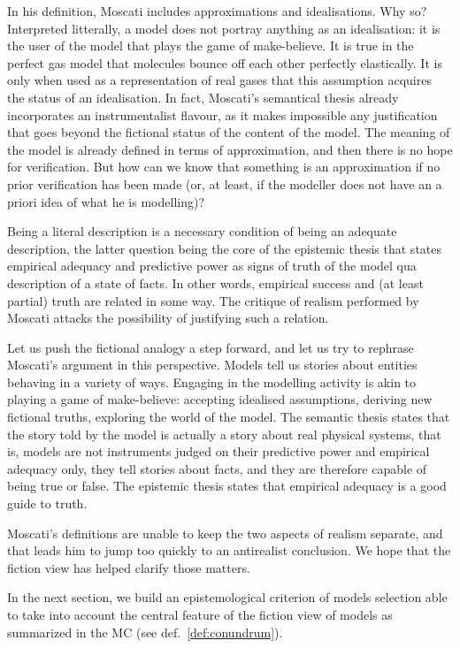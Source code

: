 \documentclass[a4paper,11pt]{article}
\theoremstyle{definition}
\begin{document}
In his definition, Moscati includes approximations and idealisations. Why so? Interpreted litterally, a model does not portray anything as an idealisation: it is the user of the model that plays the game of make-believe. It is true in the perfect gas model that molecules bounce off each other perfectly elastically. It is only when used as a representation of real gases that this assumption acquires the status of an idealisation. In fact, Moscati's semantical thesis already incorporates an instrumentalist flavour, as it makes impossible any justification that goes beyond the fictional status of the content of the model. The meaning of the model is already defined in terms of approximation, and then there is no hope for verification. But how can we know that something is an approximation if no prior verification has been made (or, at least, if the modeller does not have an a priori idea of what he is modelling)?  

Being a literal description is a necessary condition of being an adequate description, the latter question being the core of the epistemic thesis that states empirical adequacy and predictive power as signs of truth of the model qua description of a state of facts. In other words, empirical success and (at least partial) truth are related in some way. The critique of realism performed by Moscati attacks the possibility of justifying such a relation.

Let us push the fictional analogy a step forward, and let us try to rephrase Moscati's argument in this perspective. Models tell us stories about entities behaving in a variety of ways. Engaging in the modelling activity is akin to playing a game of make-believe: accepting idealised assumptions, deriving new fictional truths, exploring the world of the model. The semantic thesis states that the story told by the model is actually a story about real physical systems, that is, models are not instruments judged on their predictive power and empirical adequacy only, they tell stories about facts, and they are therefore capable of being true or false. The epistemic thesis states that empirical adequacy is a good guide to truth.

Moscati's definitions are unable to keep the two aspects of realism separate, and that leads him to jump too quickly to an antirealist conclusion. We hope that the fiction view has helped clarify those matters.

In the next section, we build an epistemological criterion of models selection able to take into account the central feature of the fiction view of models as summarized in the MC (see def.~\ref{def:conundrum}). 
\end{document}
